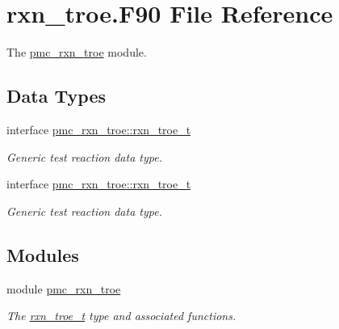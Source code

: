 \hypertarget{rxn__troe_8_f90}{}\section{rxn\+\_\+troe.\+F90 File Reference}
\label{rxn__troe_8_f90}


The \mbox{\hyperlink{namespacepmc__rxn__troe}{pmc\+\_\+rxn\+\_\+troe}} module.  


\subsection*{Data Types}
\begin{DoxyCompactItemize}
\item 
interface \mbox{\hyperlink{structpmc__rxn__troe_1_1rxn__troe__t}{pmc\+\_\+rxn\+\_\+troe\+::rxn\+\_\+troe\+\_\+t}}
\begin{DoxyCompactList}\small\item\em Generic test reaction data type. \end{DoxyCompactList}\item 
interface \mbox{\hyperlink{structpmc__rxn__troe_1_1rxn__troe__t}{pmc\+\_\+rxn\+\_\+troe\+::rxn\+\_\+troe\+\_\+t}}
\begin{DoxyCompactList}\small\item\em Generic test reaction data type. \end{DoxyCompactList}\end{DoxyCompactItemize}
\subsection*{Modules}
\begin{DoxyCompactItemize}
\item 
module \mbox{\hyperlink{namespacepmc__rxn__troe}{pmc\+\_\+rxn\+\_\+troe}}
\begin{DoxyCompactList}\small\item\em The \mbox{\hyperlink{structpmc__rxn__troe_1_1rxn__troe__t}{rxn\+\_\+troe\+\_\+t}} type and associated functions. \end{DoxyCompactList}\end{DoxyCompactItemize}
